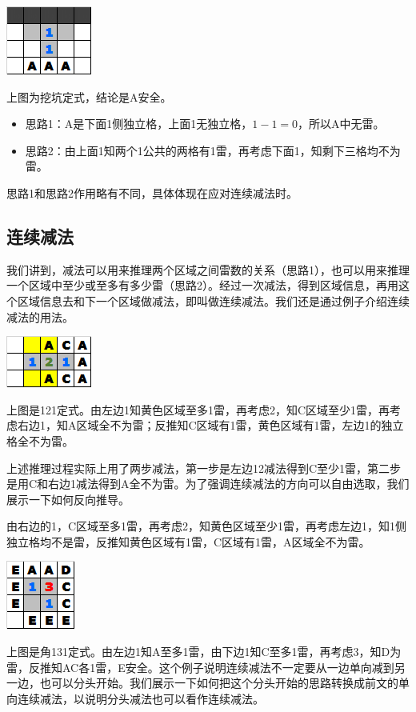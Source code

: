 \vspace{5mm}
\begin{center}
    \includegraphics{trick/减法3.png}
\end{center}
上图为挖坑定式，结论是A安全。
\begin{itemize}
    \item 思路1：A是下面1侧独立格，上面1无独立格，$1-1=0$，所以A中无雷。
    \item 思路2：由上面1知两个1公共的两格有1雷，再考虑下面1，知剩下三格均不为雷。
\end{itemize}

思路1和思路2作用略有不同，具体体现在应对连续减法时。

\subsection{连续减法}
我们讲到，减法可以用来推理两个区域之间雷数的关系（思路1），也可以用来推理一个区域中至少或至多有多少雷（思路2）。经过一次减法，得到区域信息，再用这个区域信息去和下一个区域做减法，即叫做连续减法。我们还是通过例子介绍连续减法的用法。

\vspace{5mm}
\begin{center}
    \includegraphics{trick/减法4.png}
\end{center}
上图是121定式。由左边1知黄色区域至多1雷，再考虑2，知C区域至少1雷，再考虑右边1，知A区域全不为雷；反推知C区域有1雷，黄色区域有1雷，左边1的独立格全不为雷。

上述推理过程实际上用了两步减法，第一步是左边12减法得到C至少1雷，第二步是用C和右边1减法得到A全不为雷。为了强调连续减法的方向可以自由选取，我们展示一下如何反向推导。

由右边的1，C区域至多1雷，再考虑2，知黄色区域至少1雷，再考虑左边1，知1侧独立格均不是雷，反推知黄色区域有1雷，C区域有1雷，A区域全不为雷。

\vspace{5mm}
\begin{center}
    \includegraphics{trick/减法5.png}
\end{center}
上图是角131定式。由左边1知A至多1雷，由下边1知C至多1雷，再考虑3，知D为雷，反推知AC各1雷，E安全。这个例子说明连续减法不一定要从一边单向减到另一边，也可以分头开始。我们展示一下如何把这个分头开始的思路转换成前文的单向连续减法，以说明分头减法也可以看作连续减法。

